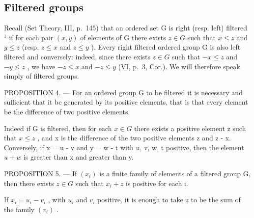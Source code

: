 \subsection{Filtered groups}

Recall (Set Theory, III, p.~145) that an ordered set G is right (resp. left) filtered \(^{1}\) if for each pair \((x, y)\) of elements of G there exists \(z \in G\) such that \(x \leqslant z\) and \(y \leqslant z\) (resp. \(z \leqslant x\) and \(z \leqslant y\) ). Every right filtered ordered group G is also left filtered and conversely: indeed, since there exists \(z \in G\) such that \(-x \leqslant z\) and \(-y \leqslant z\) , we have \(-z \leqslant x\) and \(-z \leqslant y\) (VI, p.~3, Cor.). We will therefore speak simply of filtered groups.

PROPOSITION 4. --- For an ordered group G to be filtered it is necessary and sufficient that it be generated by its positive elements, that is that every element be the difference of two positive elements.

Indeed if G is filtered, then for each \(x \in G\) there exists a positive element z such that \(x \leqslant z\) , and x is the difference of the two positive elements z and z - x. Conversely, if x = u - v and y = w - t with u, v, w, t positive, then the element \(u + w\) is greater than x and greater than y.

PROPOSITION 5. --- If \((x_i)\) is a finite family of elements of a filtered group G, then there exists \(z \in G\) such that \(x_i + z\) is positive for each i.

If \(x_{i} = u_{i} - v_{i}\) , with \(u_{i}\) and \(v_{i}\) positive, it is enough to take \(z\) to be the sum of the family \((v_{i})\) .


